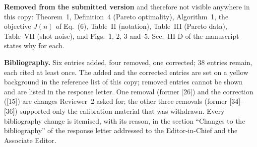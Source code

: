 \documentclass[journal]{IEEEtran}
\begin{document}
\textbf{Removed from the submitted version} and therefore not visible anywhere
in this copy: Theorem~1, Definition~4 (Pareto optimality), Algorithm~1, the
objective $J(n)$ of Eq.~(6), Table~II (notation), Table~III (Pareto data),
Table~VII (shot noise), and Figs.~1, 2, 3 and~5. Sec.~III-D of the manuscript
states why for each.

\textbf{Bibliography.} Six entries added, four removed, one corrected; $38$
entries remain, each cited at least once. The added and the corrected entries
are set on a yellow background in the reference list of this copy; removed
entries cannot be shown and are listed in the response letter. One removal
(former [26]) and the correction ([15]) are changes Reviewer~2 asked for; the
other three removals (former [34]--[36]) supported only the calibration
material that was withdrawn. Every bibliography change is itemised, with its
reason, in the section ``Changes to the bibliography'' of the response letter
addressed to the Editor-in-Chief and the Associate Editor.

\clearpage


\end{document}
